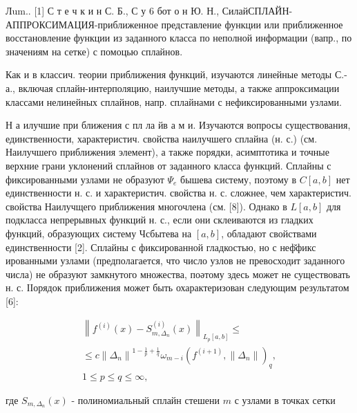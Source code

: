 \documentclass[10pt]{article}
\begin{document}
Лum.. [1] С т е ч к и н С. Б., С у 6 бот о н Ю. Н., СилайСПЛАЙН-АППРОКСИМАЦИЯ-приближенное представление функции или приближенное восстановление функции из заданного класса по неполной информации (вапр., по значениям на сетке) с помоцью сплайнов.



Как и в классич. теории приближения функций, изучаются линейные методы С.-а., включая сплайн-интерполяцию, наилучшие методы, а также аппроксимации классами нелинейных сплайнов, напр. сплайнами с нефиксированными узлами.



Н а илучшие при ближения с пл ла йв а м и. Изучаются вопросы существования, единственности, характеристич. свойства наилучшего сплайна (н. с.) (см. Наилучшего приближения элемент), а также порядки, асимптотика и точные верхние грани уклонений сплайнов от заданного класса функций. Сплайны с фиксированными узлами не образуют $\Psi_{e}$ бышева систему, поэтому в $C[a, b]$ нет единственности н. с. и характеристич. свойства н. с. сложнее, чем характеристич. свойства Наилучщего приближения многочлена (см. [8]). Однако в $L[a, b]$ для подкласса непрерывных функций н. с., если они склеиваются из гладких функций, образующих систему Чсбытева на $[a, b]$, обладают свойствами единственности [2]. Сплайны с фиксированной гладкостью, но с неф̆фикс ированными узлами (предполагается, что число узлов не превосходит заданного числа) не образуют замкнутого множества, поәтому здесь может не существовать н. с. ІІорядок приближения может быть охарактеризован следующим результатом [6]:



\[

\begin{gathered}

\left\|f^{(i)}(x)-S_{m, \Delta_{n}}^{(i)}(x)\right\|_{L_{p}[a, b]} \leqslant \\

\leqslant c\left\|\Delta_{n}\right\|^{1-\frac{1}{p}+\frac{1}{q}} \omega_{m-i}\left(f^{(i+1)},\left\|\Delta_{n}\right\|\right)_{q}, \\

1 \leqslant p \leqslant q \leqslant \infty,

\end{gathered}

\]



где $S_{m, \Delta_{n}}(x)$ - полиномиальный сплайн стешени $m$ с узлами в точках сетки
\end{document}
